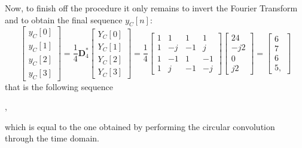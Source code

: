 \documentclass[\documentfontsize, twocolumn]{\classname}
\begin{document}
Now, to finish off the procedure it only remains to invert the Fourier Transform and to obtain the final sequence $y_C[n]$:
\begin{equation*}
    \begin{bmatrix}
        y_C[0] \\
        y_C[1] \\
        y_C[2] \\
        y_C[3]
    \end{bmatrix}
    =
    \frac 1 4 \bm{D}^*_4
    \begin{bmatrix}
        Y_C[0] \\
        Y_C[1] \\
        Y_C[2] \\
        Y_C[3]
    \end{bmatrix}
    =
    \frac 1 4
    \begin{bmatrix}
        1 & 1 & 1 & 1 \\
        1 & -j & -1 & j \\
        1 & -1 & 1 & -1 \\
        1 & j & -1 & -j
    \end{bmatrix}
    \begin{bmatrix}
        24 \\
        -j2 \\
        0 \\
        j2
    \end{bmatrix}
    =
    \begin{bmatrix}
        6 \\
        7 \\
        6 \\
        5,
    \end{bmatrix}
\end{equation*}
that is the following sequence
\begin{center}
    ,
\end{center}
which is equal to the one obtained by performing the circular convolution through the time domain.
\end{document}
